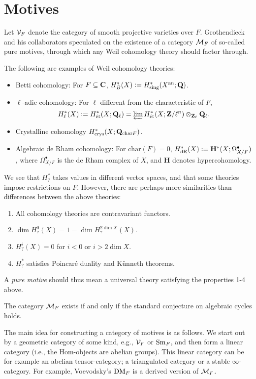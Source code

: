 \section{Motives}
Let $\mathcal{V}_F$ denote the category of smooth projective varieties over $F$. Grothendieck and his collaborators speculated on the existence of a category $\mathcal{M}_F$ of so-called pure motives, through which any Weil cohomology theory should factor through.
\begin{example}
The following are examples of Weil cohomology theories:
\begin{itemize}
\item Betti cohomology: For $F\subseteq\mathbf{C}$, $H^*_B(X)\vcentcolon= H^*_{\text{sing}}(X^{\text{an}};\mathbf{Q})$.
\item $\ell$-adic cohomology: For $\ell$ different from the characteristic of $F$, \[H_\ell^*(X)\vcentcolon= H^*_{\text{ét}}(X;\mathbf{Q}_\ell)=\varprojlim H_{\text{ét}}^*(X;\mathbf{Z}/\ell^n)\otimes_{\mathbf{Z}_\ell}\mathbf{Q}_\ell.\]
\item Crystalline cohomology $H^*_{\text{crys}}(X;\mathbf{Q}_{\text{char}F})$.
\item Algebraic de Rham cohomology: For $\text{char}(F)=0$, $H^*_{\text{dR}}(X)\vcentcolon=\mathbf H^*(X;\Omega_{X/F}^\bullet)$, where $\Omega^\bullet_{X/F}$ is the de Rham complex of $X$, and $\mathbf H$ denotes hypercohomology.
\end{itemize}
We see that $H^*_?$ takes values in different vector spaces, and that some theories impose restrictions on $F$. However, there are perhaps more similarities than differences between the above theories:
\begin{enumerate}
\item All cohomology theories are contravariant functors.
\item $\dim H^0_?(X)=1=\dim H^{2\dim X}_?(X)$.
\item $H^i_?(X)=0$ for $i<0$ or $i>2\dim X$.
\item $H^*_?$ satisfies Poincaré duality and Künneth theorems.
\end{enumerate}
A \emph{pure motive} should thus mean a universal theory satisfying the properties 1-4 above.
\end{example}

\begin{theorem}[Grothendieck]
The category $\mathcal{M}_F$ exists if and only if the standard conjecture on algebraic cycles holds.
\end{theorem}
The main idea for constructing a category of motives is as follows. We start out by a geometric category of some kind, e.g., $\mathcal{V}_F$ or $\mathrm{Sm}_F$, and then form a linear category (i.e., the Hom-objects are abelian groups). This linear category can be for example an abelian tensor-category; a triangulated category or a stable $\infty$-category. For example, Voevodsky's $\mathrm{DM}_F$ is a derived version of $\mathcal{M}_F$. 

